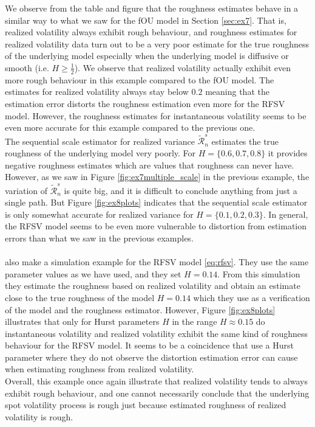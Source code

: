 \documentclass{article}
\begin{document}
We observe from the table and figure that the roughness estimates behave in a similar way to what we saw for the fOU model in Section \ref{sec:ex7}. That is, realized volatility always exhibit rough behaviour, and roughness estimates for realized volatility data turn out to be a very poor estimate for the true roughness of the underlying model especially when the underlying model is diffusive or smooth (i.e. $H\geq \frac{1}{2}$). We observe that realized volatility actually exhibit even more rough behaviour in this example compared to the fOU model. The estimates for realized volatility always stay below $0.2$ meaning that the estimation error distorts the roughness estimation even more for the RFSV model. However, the roughness estimates for instantaneous volatility seems to be even more accurate for this example compared to the previous one.\\
The sequential scale estimator for realized variance $\widetilde{\mathscr{R}}_n^s$ estimates the true roughness of the underlying model very poorly. For $H=\{0.6,0.7,0.8\}$ it provides negative roughness estimates which are values that roughness can never have. However, as we saw in Figure \ref{fig:ex7multiple_scale} in the previous example, the variation of $\widetilde{\mathscr{R}}_n^s$ is quite big, and it is difficult to conclude anything from just a single path. But Figure \ref{fig:ex8plots} indicates that the sequential scale estimator is only somewhat accurate for realized variance for $H=\{0.1,0.2,0.3\}$. In general, the RFSV model seems to be even more vulnerable to distortion from estimation errors than what we saw in the previous examples.\\\\
\cite{gatheral} also make a simulation example for the RFSV model \eqref{eq:rfsv}. They use the same parameter values as we have used, and they set $H=0.14$. From this simulation they estimate the roughness based on realized volatility and obtain an estimate close to the true roughness of the model $H=0.14$ which they use as a verification of the model and the roughness estimator. However, Figure \ref{fig:ex8plots} illustrates that only for Hurst parameters $H$ in the range $H\approx 0.15$ do instantaneous volatility and realized volatility exhibit the same kind of roughness behaviour for the RFSV model. It seems to be a coincidence that \cite{gatheral} use a Hurst parameter where they do not observe the distortion estimation error can cause when estimating roughness from realized volatility.\\
Overall, this example once again illustrate that realized volatility tends to always exhibit rough behaviour, and one cannot necessarily conclude that the underlying spot volatility process is rough just because estimated roughness of realized volatility is rough.
\end{document}
